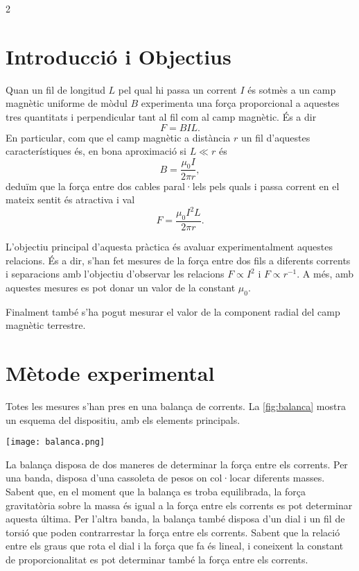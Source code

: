 \begin{multicols}{2}
	\section{Introducció i Objectius}
	Quan un fil de longitud \( L \) pel qual hi passa un corrent \( I \) és sotmès a un camp magnètic uniforme de mòdul \( B \) experimenta una força proporcional a aquestes tres quantitats i perpendicular tant al fil com al camp magnètic. És a dir
	\begin{equation} \label{eq:forca magnetica} 
		F = BIL.
	\end{equation}
	En particular, com que el camp magnètic a distància \( r \) un fil d'aquestes característiques és, en bona aproximació si \( L \ll r \) és
	\begin{equation*}
		B = \frac{\mu_0 I}{2\pi r},
	\end{equation*}
	deduïm que la força entre dos cables paral·lels pels quals i passa corrent en el mateix sentit és atractiva i val
	\begin{equation} \label{eq:forca i corrent}
		F = \frac{\mu_0I^2L}{2\pi r}.
	\end{equation}

	L'objectiu principal d'aquesta pràctica és avaluar experimentalment aquestes relacions. És a dir, s'han fet mesures de la força entre dos fils a diferents corrents i separacions amb l'objectiu d'observar les relacions \( F \propto I^2 \) i \( F \propto r^{-1} \). A més, amb aquestes mesures es pot donar un valor de la constant \( \mu_0 \).  

	Finalment també s'ha pogut mesurar el valor de la component radial del camp magnètic terrestre. 

	\section{Mètode experimental}
	Totes les mesures s'han pres en una balança de corrents. La \cref{fig:balanca} mostra un esquema del dispositiu, amb els elements principals.
	\begin{figure*}
		\centering
		\texttt{[image: balanca.png]}
		\caption{Esquema de la balança de corrents amb els principals elements}
		\label{fig:balanca}
	\end{figure*}

	La balança disposa de dos maneres de determinar la força entre els corrents. Per una banda, disposa d'una cassoleta de pesos on col·locar diferents masses. Sabent que, en el moment que la balança es troba equilibrada, la força gravitatòria sobre la massa és igual a la força entre els corrents es pot determinar aquesta última. Per l'altra banda, la balança també disposa d'un dial i un fil de torsió que poden contrarrestar la força entre els corrents. Sabent que la relació entre els graus que rota el dial i la força que fa és lineal, i coneixent la constant de proporcionalitat es pot determinar també la força entre els corrents.


\end{multicols}
